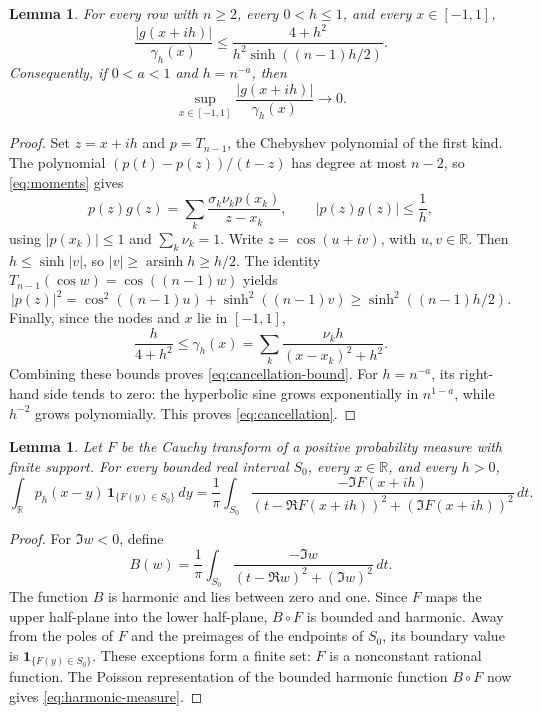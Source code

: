 \documentclass[11pt]{article}
\newtheorem{lemma}[theorem]{Lemma}
\theoremstyle{remark}
\numberwithin{equation}{section}
\newcommand{\R}{\mathbb R}
\begin{document}
\begin{lemma}\label{lem:cancellation}
For every row with \(n\ge2\), every \(0<h\le1\), and every
\(x\in[-1,1]\),
\begin{equation}\label{eq:cancellation-bound}
 \frac{|g(x+ih)|}{\gamma_h(x)}
 \le\frac{4+h^2}{h^2\sinh((n-1)h/2)}.
\end{equation}
Consequently, if \(0<a<1\) and \(h=n^{-a}\), then
\begin{equation}\label{eq:cancellation}
 \sup_{x\in[-1,1]}\frac{|g(x+ih)|}{\gamma_h(x)}\longrightarrow0.
\end{equation}
\end{lemma}

\begin{proof}
Set \(z=x+ih\) and \(p=T_{n-1}\), the Chebyshev polynomial of the
first kind. The polynomial \((p(t)-p(z))/(t-z)\) has degree at most
\(n-2\), so \eqref{eq:moments} gives
\[
 p(z)g(z)=\sum_k\frac{\sigma_k\nu_kp(x_k)}{z-x_k},
 \qquad |p(z)g(z)|\le\frac1h,
\]
using \(|p(x_k)|\le1\) and \(\sum_k\nu_k=1\).
Write \(z=\cos(u+iv)\), with \(u,v\in\R\). Then
\(h\le\sinh|v|\), so \(|v|\ge\operatorname{arsinh}h\ge h/2\).
The identity \(T_{n-1}(\cos w)=\cos((n-1)w)\) yields
\[
 |p(z)|^2=\cos^2((n-1)u)+\sinh^2((n-1)v)
 \ge\sinh^2((n-1)h/2).
\]
Finally, since the nodes and \(x\) lie in \([-1,1]\),
\[
 \frac{h}{4+h^2}\le
 \gamma_h(x)=\sum_k\frac{\nu_kh}{(x-x_k)^2+h^2}.
\]
Combining these bounds proves \eqref{eq:cancellation-bound}.
For \(h=n^{-a}\), its right-hand side tends to zero: the hyperbolic
sine grows exponentially in \(n^{1-a}\), while \(h^{-2}\) grows
polynomially. This proves \eqref{eq:cancellation}.
\end{proof}

\begin{lemma}\label{lem:boundary}
Let \(F\) be the Cauchy transform of a positive probability measure with
finite support. For every bounded real interval \(S_0\), every \(x\in\R\), and
every \(h>0\),
\begin{equation}\label{eq:harmonic-measure}
 \int_{\mathbb R}p_h(x-y)\,
            \mathbf1_{\{F(y)\in S_0\}}\,dy
 =\frac1\pi\int_{S_0}
       \frac{-\Im F(x+ih)}{(t-\Re F(x+ih))^2+(\Im F(x+ih))^2}\,dt.
\end{equation}
\end{lemma}

\begin{proof}
For \(\Im w<0\), define
\[
 B(w)=\frac1\pi\int_{S_0}
       \frac{-\Im w}{(t-\Re w)^2+(\Im w)^2}\,dt.
\]
The function \(B\) is harmonic and lies between zero and one.
Since \(F\) maps the upper half-plane into the lower half-plane,
\(B\circ F\) is bounded and harmonic. Away from the poles of \(F\)
and the preimages of the endpoints of \(S_0\), its boundary value is
\(\mathbf1_{\{F(y)\in S_0\}}\). These exceptions form a finite set:
\(F\) is a nonconstant rational function. The Poisson representation
of the bounded harmonic function \(B\circ F\) now gives
\eqref{eq:harmonic-measure}.
\end{proof}
\end{document}
